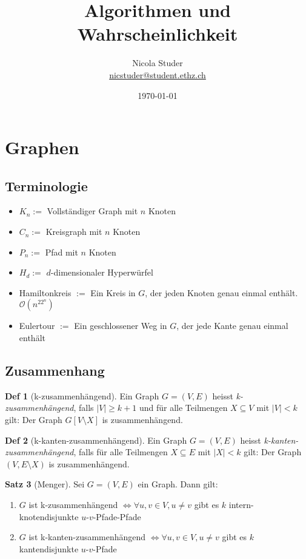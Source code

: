 \documentclass[a4paper, 10pt]{article}
\title{Algorithmen und Wahrscheinlichkeit}
\author{Nicola Studer \\ \href{mailto:nicstuder@student.ethz.ch}{nicstuder@student.ethz.ch}}
\date{\today}
\theoremstyle{definition}
\newtheorem{definition}{Def}[section]
\newtheorem{theorem}[definition]{Satz}
\theoremstyle{named}
\newcommand{\BO}{\mathcal{O}}
\begin{document}
\maketitle

\section{Graphen}
\subsection{Terminologie}
\begin{itemize}
    \item $K_n :=$ Vollständiger Graph mit $n$ Knoten
    \item $C_n :=$ Kreisgraph mit $n$ Knoten
    \item $P_n :=$ Pfad mit $n$ Knoten
    \item $H_d :=$ $d$-dimensionaler Hyperwürfel
    \item Hamiltonkreis $:=$ Ein Kreis in $G$, der jeden Knoten genau einmal enthält. $\BO(n^22^n)$
    \item Eulertour $:=$ Ein geschlossener Weg in $G$, der jede Kante genau einmal enthält
\end{itemize}

\subsection{Zusammenhang}

\setcounter{definition}{22}
\begin{definition}[k-zusammenhängend]
    Ein Graph $G = (V, E)$ heisst \textit{k-zusammenhängend}, falls $|V| \geq k + 1$ und für alle Teilmengen $X \subseteq V$ mit $|V| < k$ gilt: Der Graph $G[V \setminus X]$ is zusammenhängend.
\end{definition}

\begin{definition}[k-kanten-zusammenhängend]
    Ein Graph $G = (V, E)$ heisst \textit{k-kanten-zusammenhängend}, falls für alle Teilmengen $X \subseteq E$ mit $|X| < k$ gilt: Der Graph $(V, E \setminus X)$ is zusammenhängend.
\end{definition}

\begin{theorem}[Menger]
    Sei $G = (V, E)$ ein Graph. Dann gilt:
    \begin{enumerate}[label=\alph*)]
        \item $G$ ist k-zusammenhängend $\iff \forall u,v \in V, u \neq v$ gibt es $k$ intern-knotendisjunkte $u$-$v$-Pfade-Pfade 
        \item $G$ ist k-kanten-zusammenhängend $\iff \forall u,v \in V, u\neq v$ gibt es $k$ kantendisjunkte $u$-$v$-Pfade
    \end{enumerate}
\end{theorem}
\end{document}
